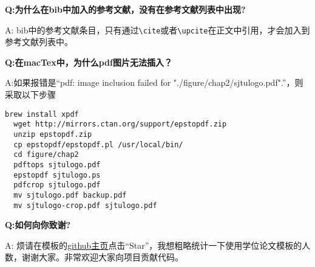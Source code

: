 {\bfseries{}Q:为什么在bib中加入的参考文献，没有在参考文献列表中出现?}

A: bib中的参考文献条目，只有通过\verb+\cite+或者\verb+\upcite+在正文中引用，才会加入到参考文献列表中。

{\bfseries{}Q:在macTex中，为什么pdf图片无法插入？}

A:如果报错是“pdf: image inclusion failed for "./figure/chap2/sjtulogo.pdf".”，则采取以下步骤

\begin{lstlisting}[basicstyle=\small\ttfamily, caption={编译模板}, numbers=none]
  brew install xpdf
  wget http://mirrors.ctan.org/support/epstopdf.zip
  unzip epstopdf.zip
  cp epstopdf/epstopdf.pl /usr/local/bin/
  cd figure/chap2
  pdftops sjtulogo.pdf
  epstopdf sjtulogo.ps
  pdfcrop sjtulogo.pdf
  mv sjtulogo.pdf backup.pdf
  mv sjtulogo-crop.pdf sjtulogo.pdf
\end{lstlisting}

{\bfseries{}Q:如何向你致谢?}

A: 烦请在模板的\href{https://github.com/weijianwen/SJTUThesis}{github主页}点击“Star”，我想粗略统计一下使用学位论文模板的人数，谢谢大家。非常欢迎大家向项目贡献代码。
